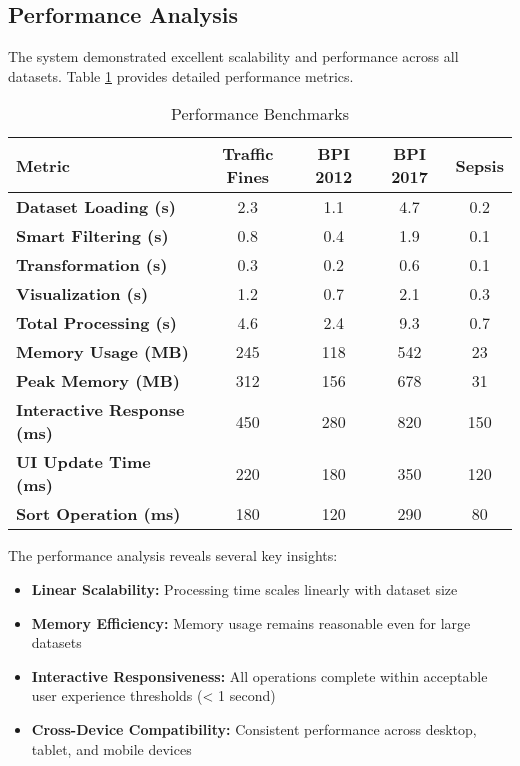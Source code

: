 \documentclass[11pt,a4paper]{article}
\begin{document}
\subsection{Performance Analysis}

The system demonstrated excellent scalability and performance across all datasets. Table \ref{tab:performance} provides detailed performance metrics.

\begin{table}[H]
\centering
\caption{Performance Benchmarks}
\label{tab:performance}
\begin{tabular}{@{}lcccc@{}}
\toprule
\textbf{Metric} & \textbf{Traffic Fines} & \textbf{BPI 2012} & \textbf{BPI 2017} & \textbf{Sepsis} \\
\midrule
\textbf{Dataset Loading (s)} & 2.3 & 1.1 & 4.7 & 0.2 \\
\textbf{Smart Filtering (s)} & 0.8 & 0.4 & 1.9 & 0.1 \\
\textbf{Transformation (s)} & 0.3 & 0.2 & 0.6 & 0.1 \\
\textbf{Visualization (s)} & 1.2 & 0.7 & 2.1 & 0.3 \\
\textbf{Total Processing (s)} & 4.6 & 2.4 & 9.3 & 0.7 \\
\textbf{Memory Usage (MB)} & 245 & 118 & 542 & 23 \\
\textbf{Peak Memory (MB)} & 312 & 156 & 678 & 31 \\
\midrule
\textbf{Interactive Response (ms)} & 450 & 280 & 820 & 150 \\
\textbf{UI Update Time (ms)} & 220 & 180 & 350 & 120 \\
\textbf{Sort Operation (ms)} & 180 & 120 & 290 & 80 \\
\bottomrule
\end{tabular}
\end{table}

The performance analysis reveals several key insights:

\begin{itemize}
    \item \textbf{Linear Scalability:} Processing time scales linearly with dataset size
    \item \textbf{Memory Efficiency:} Memory usage remains reasonable even for large datasets
    \item \textbf{Interactive Responsiveness:} All operations complete within acceptable user experience thresholds (< 1 second)
    \item \textbf{Cross-Device Compatibility:} Consistent performance across desktop, tablet, and mobile devices
\end{itemize}
\end{document}
